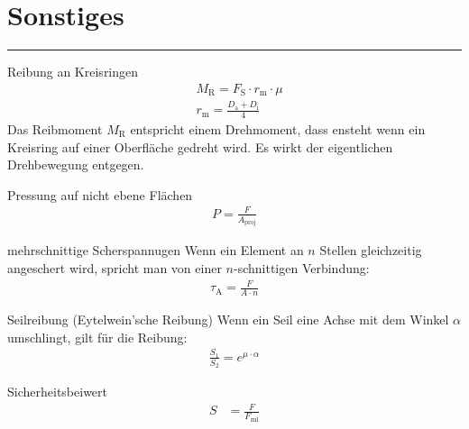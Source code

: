 \section{Sonstiges}
\hrule
\begin{eeqn}{Reibung an Kreisringen}
	\begin{align}
		& M_\text{R} = F_\text{S}\cdot r_\text{m} \cdot \mu \\
		& r_\text{m} = \frac{D_\text{a}+D_\text{i}}{4}
	\end{align}
	Das Reibmoment $M_\text{R}$ entspricht einem Drehmoment, dass ensteht wenn ein Kreisring auf einer Oberfläche gedreht wird. Es wirkt der eigentlichen Drehbewegung entgegen.
\end{eeqn}

\begin{eeqn}{Pressung auf nicht ebene Flächen}
	\begin{align}
		P = \frac{F}{A_\text{proj}}
	\end{align}
\end{eeqn}

\begin{eeqn}{mehrschnittige Scherspannugen}
	Wenn ein Element an $n$ Stellen gleichzeitig angeschert wird, spricht man von einer $n$-schnittigen Verbindung:
	\begin{align}
		\tau_\text{A} = \frac{F}{A\cdot n}
	\end{align}
\end{eeqn}

\begin{eeqn}{Seilreibung (Eytelwein'sche Reibung)}
	Wenn ein Seil eine Achse mit dem Winkel $\alpha$ umschlingt, gilt für die Reibung:
	\begin{align}
		\frac{S_1}{S_2} = e^{\mu \cdot \alpha}
	\end{align}
\end{eeqn}

\begin{eeqn}{Sicherheitsbeiwert}
	\begin{align}
		S &= \frac{F}{F_\text{zul}}
	\end{align}
\end{eeqn}
